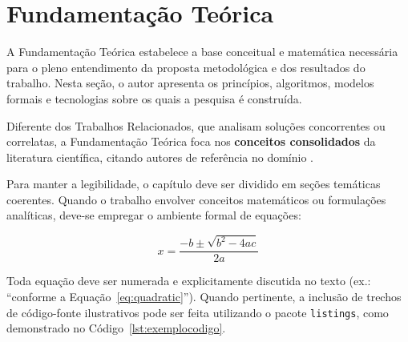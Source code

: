 \chapter{Fundamentação Teórica}
\label{chap:fundamentacao}

A Fundamentação Teórica estabelece a base conceitual e matemática necessária para o pleno entendimento da proposta metodológica e dos resultados do trabalho. Nesta seção, o autor apresenta os princípios, algoritmos, modelos formais e tecnologias sobre os quais a pesquisa é construída.

Diferente dos Trabalhos Relacionados, que analisam soluções concorrentes ou correlatas, a Fundamentação Teórica foca nos \textbf{conceitos consolidados} da literatura científica, citando autores de referência no domínio \cite{Ding2020AdversarialAttacks}.

Para manter a legibilidade, o capítulo deve ser dividido em seções temáticas coerentes. Quando o trabalho envolver conceitos matemáticos ou formulações analíticas, deve-se empregar o ambiente formal de equações:

\begin{equation}
    x = \frac{-b \pm \sqrt{b^2 - 4ac}}{2a}
    \label{eq:quadratic}
\end{equation}

Toda equação deve ser numerada e explicitamente discutida no texto (ex.: \enquote{conforme a Equação~\ref{eq:quadratic}}). Quando pertinente, a inclusão de trechos de código-fonte ilustrativos pode ser feita utilizando o pacote \texttt{listings}, como demonstrado no Código~\ref{lst:exemplocodigo}.


\hfill
\begin{minipage}[t]{.65\textwidth}
\fonteautor
\end{minipage}
